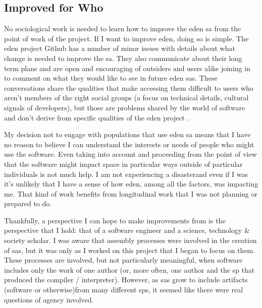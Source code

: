 \documentclass[a4paper,man,natbib,floatsintext]{apa6}
\begin{document}
  \subsection{Improved for Who}
  No sociological work is needed to learn how to improve the \acrshort{eden} \gls{sa} from the point of work of the project. If I want to improve \acrshort{eden}, doing so is simple. The \acrshort{eden} project Github has a number of minor issues with details about what change is needed to improve the \gls{sa}. They also communicate about their long term plans and are open and encouraging of outsiders and users alike joining in to comment on what they would like to see in future \acrshort{eden} \glspl{sa}. These conversations share the qualities that make accessing them difficult to users who aren't members of the right social groups (a focus on technical details, cultural signals of developers), but those are problems shared by the world of software and don't derive from specific qualities of the \acrshort{eden} project \citep{Drexler2019-tk,Kelty2008-jm}.

  My decision not to engage with populations that use \acrshort{eden} \gls{sa} means that I have no reason to believe I can understand the interests or needs of people who might use the software. Even taking \citet{Kitchin2011-af} into account and proceeding from the point of view that the software might impact space in particular ways outside of particular individuals is not much help. I am not experiencing a disaster\footnotemark and even if I was it's unlikely that I have a sense of how \acrshort{eden}, among all the factors, was impacting me. That kind of work benefits from longitudinal work that I was not planning or prepared to do.


  Thankfully, a perspective I can hope to make improvements from is the perspective that I hold: that of a software engineer and a science, technology \& society scholar. I was aware that assembly processes were involved in the creation of \glspl{sa}, but it was only as I worked on this project that I began to focus on them. These processes are involved, but not particularly meaningful, when software includes only the work of one author (or, more often, one author and the \gls{sp} that produced the compiler / interpreter). However, as \glspl{sa} grow to include artifacts (software or otherwise)from many different \glspl{sp}, it seemed like there were real questions of agency involved. 
\end{document}
